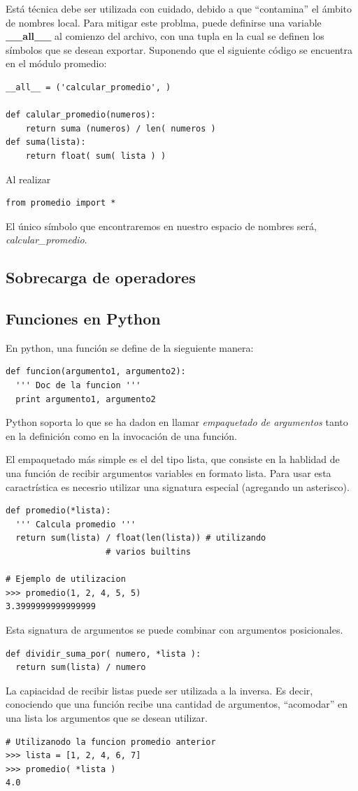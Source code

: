 \documentclass[a4paper]{report}
\begin{document}
Está técnica debe ser utilizada con cuidado, debido a que ``contamina'' el ámbito de nombres local. Para
mitigar este problma, puede definirse una variable \textbf{\_\_all\_\_} al comienzo del archivo, con una tupla
en la cual se definen los símbolos que se desean exportar. Suponendo que el siguiente código se encuentra
en el módulo promedio:

\begin{lstlisting}[style=python]
__all__ = ('calcular_promedio', )

def calular_promedio(numeros):
    return suma (numeros) / len( numeros )
def suma(lista):
    return float( sum( lista ) ) 
\end{lstlisting}

Al realizar
\begin{lstlisting}[style=python]
 from promedio import *
\end{lstlisting}

El único símbolo que encontraremos en nuestro espacio de nombres será, \emph{calcular\_promedio}.
\subsection{Sobrecarga de operadores}

\subsection{Funciones en Python}
En python, una función se define de la sieguiente manera:
\begin{lstlisting}[style=python]
def funcion(argumento1, argumento2):
  ''' Doc de la funcion '''
  print argumento1, argumento2
\end{lstlisting}
Python soporta lo que se ha dadon en llamar \emph{empaquetado de argumentos } tanto en la 
definición como en la invocación de una función.

El empaquetado más simple es el del tipo lista, que consiste en la hablidad de una función de
recibir argumentos variables en formato lista. Para usar esta caractrística es necesrio utilizar
una signatura especial (agregando un asterisco).

\begin{lstlisting}[style=python]
def promedio(*lista):
  ''' Calcula promedio '''
  return sum(lista) / float(len(lista)) # utilizando 
					# varios builtins

# Ejemplo de utilizacion
>>> promedio(1, 2, 4, 5, 5)
3.3999999999999999

\end{lstlisting}
Esta signatura de argumentos se puede combinar con argumentos posicionales.
\begin{lstlisting}[style=python]
def dividir_suma_por( numero, *lista ):
  return sum(lista) / numero
\end{lstlisting}
La capiacidad de recibir listas puede ser utilizada a la inversa. Es decir, conociendo que una función
recibe una cantidad de argumentos, ``acomodar'' en una lista los argumentos que se desean utilizar.
\begin{lstlisting}[style=python]
# Utilizanodo la funcion promedio anterior
>>> lista = [1, 2, 4, 6, 7]
>>> promedio( *lista )
4.0
\end{lstlisting}
\end{document}
